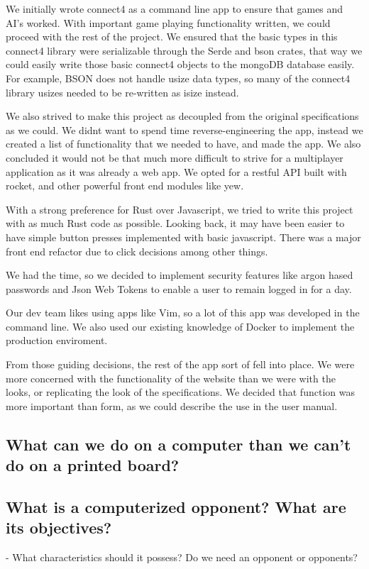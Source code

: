 \documentclass[letterpaper]{article}
\begin{document}
We initially wrote connect4 as a command line app to ensure that games and AI's worked. With important game playing functionality written, we could proceed with the rest of the project. We ensured that the basic types in this connect4 library were serializable through the Serde and bson crates, that way we could easily write those basic connect4 objects to the mongoDB database easily. For example, BSON does not handle usize data types, so many of the connect4 library usizes needed to be re-written as isize instead.

We also strived to make this project as decoupled from the original specifications as we could. We didnt want to spend time reverse-engineering the app, instead we created a list of functionality that we needed to have, and made the app. We also concluded it would not be that much more difficult to strive for a multiplayer application as it was already a web app. We opted for a restful API built with rocket, and other powerful front end modules like yew.

With a strong preference for Rust over Javascript, we tried to write this project with as much Rust code as possible. Looking back, it may have been easier to have simple button presses implemented with basic javascript. There was a major front end refactor due to click decisions among other things.

We had the time, so we decided to implement security features like argon hased passwords and Json Web Tokens to enable a user to remain logged in for a day.


Our dev team likes using apps like Vim, so a lot of this app was developed in the command line. We also used our existing knowledge of Docker to implement the production enviroment.


From those guiding decisions, the rest of the app sort of fell into place. We were more concerned with the functionality of the website than we were with the looks, or replicating the look of the specifications. We decided that function was more important than form, as we could describe the use in the user manual.

\subsection{What can we do on a computer than we can’t do on a printed board?}

\subsection{What is a computerized opponent? What are its objectives?}
- What characteristics should it possess? Do we need an opponent or opponents?
\end{document}
